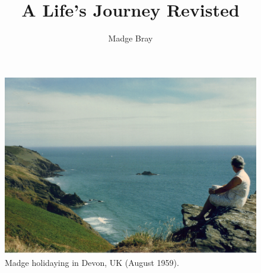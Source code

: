 \documentclass[12pt, letterpaper, twoside]{book}
\begin{document}
\frontmatter %
    \title{A Life's Journey Revisted}
    \author{Madge Bray}
    \maketitle

    \begin{figure}
      \includegraphics[width=\textwidth]{photos/madge-by-sea.jpg}
      \caption{Madge holidaying in Devon, UK (August 1959).}
      \label{madge-by-sea}
    \end{figure}

    \tableofcontents

    
    


\mainmatter  %
    


\appendix
    
    

\backmatter
\end{document}
